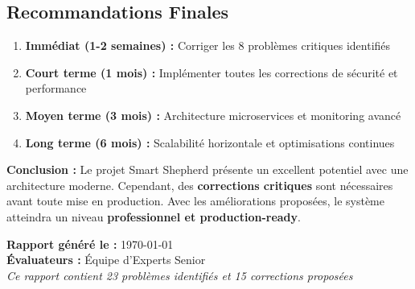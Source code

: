 \documentclass[a4paper,12pt]{article}
\begin{document}
\subsection{Recommandations Finales}

\begin{tcolorbox}[colback=primaryblue!10, colframe=primaryblue, title={\faIcon{lightbulb} Recommandations Stratégiques}]
\begin{enumerate}
    \item \textbf{Immédiat (1-2 semaines) :} Corriger les 8 problèmes critiques identifiés
    \item \textbf{Court terme (1 mois) :} Implémenter toutes les corrections de sécurité et performance
    \item \textbf{Moyen terme (3 mois) :} Architecture microservices et monitoring avancé
    \item \textbf{Long terme (6 mois) :} Scalabilité horizontale et optimisations continues
\end{enumerate}

\textbf{Conclusion :} Le projet Smart Shepherd présente un excellent potentiel avec une architecture moderne. Cependant, des \textbf{corrections critiques} sont nécessaires avant toute mise en production. Avec les améliorations proposées, le système atteindra un niveau \textbf{professionnel et production-ready}.
\end{tcolorbox}

\begin{center}
\Large\textbf{Rapport généré le :} \today \\
\vspace{0.5cm}
\large\textbf{Évaluateurs :} Équipe d'Experts Senior \\
\vspace{0.5cm}
\normalsize\textit{Ce rapport contient 23 problèmes identifiés et 15 corrections proposées}
\end{center}
\end{document}
